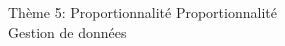 \documentclass[10pt]{article}
\begin{document}
\begin{encadrementombre}{Thème 5: Proportionnalité}
{\LARGE Proportionnalité }\\

{\Large Gestion de données}
\end{encadrementombre}



\end{document}
